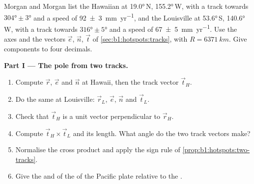 \begin{problem}
\label{pb:b1:hotspots:1}
Morgan and Morgan list the Hawaiian  at \ang{19.0}\,N, \ang{155.2}\,W,
with a track towards $\ang{304}\pm\ang{3}$ and a speed of
\qty[uncertainty-mode=separate]{92 \pm 3}{mm.yr^{-1}}, and the Louisville
 at \ang{53.6}\,S, \ang{140.6}\,W, with a track towards $\ang{316}\pm\ang{5}$
and a speed of \qty[uncertainty-mode=separate]{67 \pm 5}{mm.yr^{-1}}. Use the
axes and the vectors $\vec e$, $\vec n$, $\vec t$ of
\cref{sec:b1:hotspots:tracks}, with $R = \qty{6371}{km}$. Give components to
four decimals.

\medskip
\noindent\textbf{Part I --- The pole from two tracks.}
\begin{enumerate}
  \item Compute $\vec r$, $\vec e$ and $\vec n$ at Hawaii, then the track
        vector $\vec t_H$.
  \item Do the same at Louisville: $\vec r_L$, $\vec e$, $\vec n$ and
        $\vec t_L$.
  \item Check that $\vec t_H$ is a unit vector perpendicular to $\vec r_H$.
  \item Compute $\vec t_H\times\vec t_L$ and its length. What angle do the two
        track vectors make?
  \item Normalise the cross product and apply the sign rule of
        \cref{prop:b1:hotspots:two-tracks}.
  \item Give the  and  of the  of the Pacific plate
        relative to the .
\end{enumerate}


\end{problem}
